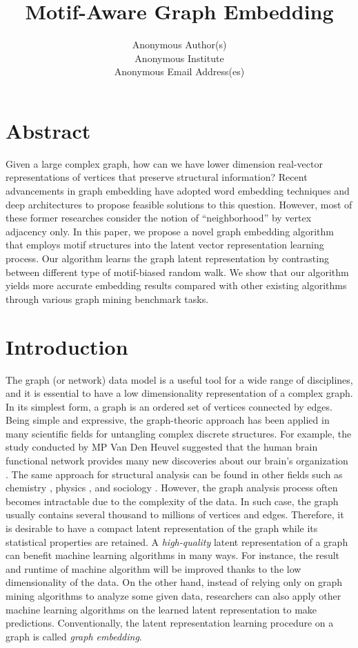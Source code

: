 \documentclass[letterpaper]{article}
\title{Motif-Aware Graph Embedding}
\author{
    Anonymous Author(s) \\
    Anonymous Institute \\
    Anonymous Email Address(es) \\
}
\begin{document}
    \maketitle

    \section{Abstract}
       Given a large complex graph, how can we have lower dimension real-vector representations 
       of vertices that preserve structural information? Recent advancements in graph embedding 
       have adopted word embedding techniques and deep architectures to propose feasible solutions
       to this question. However, most of these former researches consider the notion of ``neighborhood'' 
       by vertex adjacency only. In this paper, we propose a novel graph embedding algorithm that employs 
       motif structures into the latent vector representation learning process. Our algorithm learns 
       the graph latent representation by contrasting between different type of motif-biased random walk. 
       We show that our algorithm yields more accurate embedding results compared with other existing 
       algorithms through various graph mining benchmark tasks.

    \setcounter{secnumdepth}{2}
    \section{Introduction}
        The graph (or network) data model is a useful tool for a wide range of disciplines, and
        it is essential to have a low dimensionality representation of a complex graph. In its
        simplest form, a graph is an ordered set of vertices connected by edges. Being simple
        and expressive, the graph-theoric approach has been applied in many scientific fields
        for untangling complex discrete structures. For example, the study conducted by 
        MP Van Den Heuvel suggested that the human brain functional network provides many new
        discoveries about our brain's organization \cite{BrainNetHeuvel}. The same approach
        for structural analysis can be found in other fields such as chemistry \cite{molecule}, 
        physics \cite{physicnet}, and sociology \cite{socialnet}. However, the graph analysis
        process often becomes intractable due to the complexity of the data. In such case,
        the graph usually contains several thousand to millions of vertices and edges.
        Therefore, it is desirable to have a compact latent representation of the graph while
        its statistical properties are retained. A \emph{high-quality} latent representation
        of a graph can benefit machine learning algorithms in many ways. For instance, 
        the result and runtime of machine algorithm will be improved thanks to the low
        dimensionality of the data. On the other hand, instead of relying only on graph 
        mining algorithms to analyze some given data, researchers can also apply other
        machine learning algorithms on the learned latent representation to make predictions.
        Conventionally, the latent representation learning procedure on a graph is called
        \emph{graph embedding}.
\end{document}
